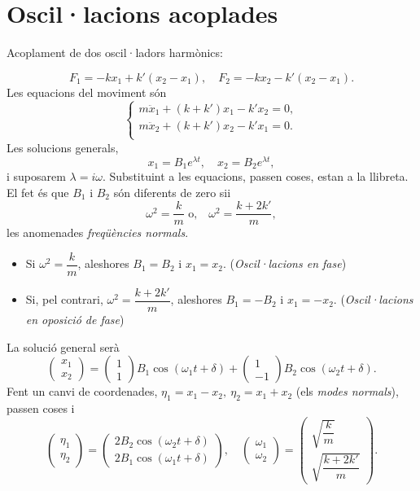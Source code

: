 \section{Oscil·lacions acoplades}
Acoplament de dos oscil·ladors harmònics:
\begin{center}
\end{center}
\[
F_1=-kx_1+k'(x_2-x_1),\quad F_2=-kx_2-k'(x_2-x_1).
\]
Les equacions del moviment són
\[
\begin{cases}
m\ddot x_1+(k+k')x_1-k'x_2=0,\\
m\ddot x_2+(k+k')x_2-k'x_1=0.\\
\end{cases}
\]
Les solucions generals,
\[
x_1=B_1e^{\lambda t},\quad x_2=B_2e^{\lambda t},
\]
i suposarem $\lambda=i\omega$. Substituint a les equacions, passen coses, estan a la llibreta. El fet és que $B_1$ i $B_2$ són diferents de zero sii
\[
\omega^2=\dfrac{k}{m}\text{ o,}\quad\omega^2=\dfrac{k+2k'}{m},
\]
les anomenades \textit{freqüències normals}.
\begin{itemize}
	\item Si $\omega^2=\dfrac{k}{m}$, aleshores $\boxed{B_1=B_2}$ i $\boxed{x_1=x_2}$. (\textit{Oscil·lacions en fase})
	\item Si, pel contrari, $\omega^2=\dfrac{k+2k'}{m}$, aleshores $\boxed{B_1=-B_2}$ i $\boxed{x_1=-x_2}$. (\textit{Oscil·lacions en oposició de fase})
\end{itemize}
La solució general serà
\[
\begin{pmatrix}x_1\\ x_2\end{pmatrix}=\begin{pmatrix}1\\ 1\end{pmatrix}B_1\cos(\omega_1t+\delta)+\begin{pmatrix}1\\ -1\end{pmatrix}B_2\cos(\omega_2t+\delta).
\]
Fent un canvi de coordenades, $\eta_1=x_1-x_2,\ \eta_2=x_1+x_2$ (els \textit{modes normals}), passen coses i
\[
\begin{pmatrix}\eta_1\\ \eta_2\end{pmatrix}=\begin{pmatrix}2B_2\cos(\omega_2t+\delta)\\ 2B_1\cos(\omega_1t+\delta)\end{pmatrix},\quad\begin{pmatrix}\omega_1\\ \omega_2\end{pmatrix}=\begin{pmatrix}\sqrt{\dfrac{k}{m}}\\ \sqrt{\dfrac{k+2k'}{m}}\end{pmatrix}.
\]
